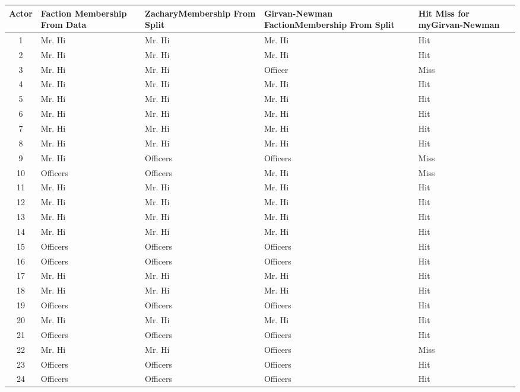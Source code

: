 \documentclass[letterpaper,10pt]{article}
\begin{document}
\newpage
\begin{table}
\small
\begin{tabular}{ | c | p{2cm} | p{2cm} | p{2cm} | p{2cm} | }
\hline
Actor & Faction Membership \newline From Data & Zachary\newline Membership From Split & Girvan-Newman Faction\newline Membership From Split & Hit Miss for my\newline Girvan-Newman\\
\hline
1 & Mr. Hi & Mr. Hi & Mr. Hi & Hit \\
\hline
2 & Mr. Hi & Mr. Hi & Mr. Hi & Hit \\
\hline
3 & Mr. Hi & Mr. Hi & Officer & Miss \\
\hline
4 & Mr. Hi & Mr. Hi & Mr. Hi & Hit \\
\hline
5 & Mr. Hi & Mr. Hi & Mr. Hi & Hit \\
\hline
6 & Mr. Hi & Mr. Hi & Mr. Hi & Hit \\
\hline
7 & Mr. Hi & Mr. Hi & Mr. Hi & Hit \\
\hline
8 & Mr. Hi & Mr. Hi & Mr. Hi & Hit \\
\hline
9 & Mr. Hi & Officers & Officers & Miss \\
\hline
10 & Officers & Officers & Mr. Hi & Miss \\
\hline
11 & Mr. Hi & Mr. Hi & Mr. Hi & Hit \\
\hline
12 & Mr. Hi & Mr. Hi & Mr. Hi & Hit \\
\hline
13 & Mr. Hi & Mr. Hi & Mr. Hi & Hit \\
\hline
14 & Mr. Hi & Mr. Hi & Mr. Hi & Hit \\
\hline
15 & Officers & Officers & Officers & Hit \\
\hline
16 & Officers & Officers & Officers & Hit \\
\hline
17 & Mr. Hi & Mr. Hi & Mr. Hi & Hit \\
\hline
18 & Mr. Hi & Mr. Hi & Mr. Hi & Hit \\
\hline
19 & Officers & Officers & Officers & Hit \\
\hline
20 & Mr. Hi & Mr. Hi & Mr. Hi & Hit \\
\hline
21 & Officers & Officers & Officers & Hit \\
\hline
22 & Mr. Hi & Mr. Hi &  Officers & Miss \\
\hline
23 & Officers & Officers & Officers & Hit \\
\hline
24 & Officers & Officers & Officers & Hit \\

\end{tabular}
\end{table}
\end{document}
